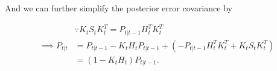 \documentclass{article}
\begin{document}
And we can further simplify the posterior error covariance by

\begin{align*}
  &\because K_{t}S_{t}K_{t}^{T} = P_{t|t-1}H_{t}^{T}K_{t}^{T}\\
  \implies
  P_{t|t}
  &= P_{t|t-1} - K_{t}H_{t}P_{t|t-1} +
  (- P_{t|t-1}H_{t}^{T}K_{t}^{T} + K_{t}S_{t}K_{t}^{T})\\
  &= (1 - K_{t}H_{t})P_{t|t-1}
.\end{align*}
\end{document}
